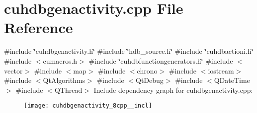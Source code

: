 \section{cuhdbgenactivity.\+cpp File Reference}
\label{cuhdbgenactivity_8cpp}
{\ttfamily \#include \char`\"{}cuhdbgenactivity.\+h\char`\"{}}\newline
{\ttfamily \#include \char`\"{}hdb\+\_\+source.\+h\char`\"{}}\newline
{\ttfamily \#include \char`\"{}cuhdbactioni.\+h\char`\"{}}\newline
{\ttfamily \#include $<$cumacros.\+h$>$}\newline
{\ttfamily \#include \char`\"{}cuhdbfunctiongenerators.\+h\char`\"{}}\newline
{\ttfamily \#include $<$vector$>$}\newline
{\ttfamily \#include $<$map$>$}\newline
{\ttfamily \#include $<$chrono$>$}\newline
{\ttfamily \#include $<$iostream$>$}\newline
{\ttfamily \#include $<$Qt\+Algorithms$>$}\newline
{\ttfamily \#include $<$Qt\+Debug$>$}\newline
{\ttfamily \#include $<$Q\+Date\+Time$>$}\newline
{\ttfamily \#include $<$Q\+Thread$>$}\newline
Include dependency graph for cuhdbgenactivity.\+cpp\+:
\nopagebreak
\begin{figure}[H]
\begin{center}
\leavevmode
\texttt{[image: cuhdbgenactivity\_8cpp\_\_incl]}
\end{center}
\end{figure}
